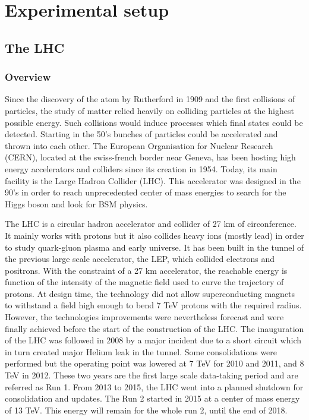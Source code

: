 \part{Experimental setup}
\chapter{The LHC}
\label{sec:org2fe8850}
\section{Overview}
\label{sec:orgf8550e4}
Since the discovery of the atom by Rutherford in 1909 and the first collisions of particles, the study of matter relied heavily on colliding particles at the highest possible energy.
Such collisions would induce processes which final states could be detected.
Starting in the 50's bunches of particles could be accelerated and thrown into each other.
The European Organisation for Nuclear Research (CERN), located at the swiss-french border near Geneva, has been hosting high energy accelerators and colliders since its creation in 1954.
Today, its main facility is the Large Hadron Collider (LHC).
This accelerator was designed in the 90's in order to reach unprecedented center of mass energies to search for the Higgs boson and look for BSM physics.

The LHC is a circular hadron accelerator and collider of 27 km of circonference.
It mainly works with protons but it also collides heavy ions (mostly lead) in order to study quark-gluon plasma and early universe.
It has been built in the tunnel of the previous large scale accelerator, the LEP, which collided electrons and positrons.
With the constraint of a 27 km accelerator, the reachable energy is function of the intensity of the magnetic field used to curve the trajectory of protons.
At design time, the technology did not allow superconducting magnets to withstand a field high enough to bend 7 TeV protons with the required radius.
However, the technologies improvements were nevertheless forecast and were finally achieved before the start of the construction of the LHC.
The inauguration of the LHC was followed in 2008 by a major incident due to a short circuit which in turn created major Helium leak in the tunnel.
Some consolidations were performed but the operating point was lowered at 7 TeV for 2010 and 2011, and 8 TeV in 2012.
These two years are the first large scale data-taking period and are referred as Run 1.
From 2013 to 2015, the LHC went into a planned shutdown for consolidation and updates.
The Run 2 started in 2015 at a center of mass energy of 13 TeV.
This energy will remain for the whole run 2, until the end of 2018.

